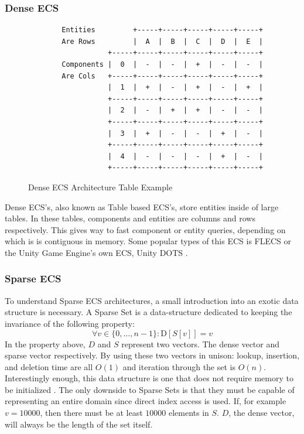 \subsubsection{Dense ECS}
\begin{figure}[htbp]
    \centering
    \begin{verbatim}
        Entities         +-----+-----+-----+-----+-----+  
        Are Rows         |  A  |  B  |  C  |  D  |  E  |  
                   +-----+-----+-----+-----+-----+-----+  
        Components |  0  |  -  |  -  |  +  |  -  |  -  |  
        Are Cols   +-----+-----+-----+-----+-----+-----+  
                   |  1  |  +  |  -  |  +  |  -  |  +  |  
                   +-----+-----+-----+-----+-----+-----+  
                   |  2  |  -  |  +  |  +  |  -  |  -  |  
                   +-----+-----+-----+-----+-----+-----+  
                   |  3  |  +  |  -  |  -  |  +  |  -  |  
                   +-----+-----+-----+-----+-----+-----+  
                   |  4  |  -  |  -  |  -  |  +  |  -  |  
                   +-----+-----+-----+-----+-----+-----+                                 
    \end{verbatim}
    \caption{Dense ECS Architecture Table Example}
\end{figure}

Dense ECS's, also known as Table based ECS's, store entities inside of large tables. In these tables, components and entities are columns and rows respectively. This gives way to fast component or entity queries, depending on which is is contiguous in memory. Some popular types of this ECS is FLECS or the Unity Game Engine's own ECS, Unity DOTS \cite{SanderMertensFAQ}.

\subsubsection{Sparse ECS}
To understand Sparse ECS architectures, a small introduction into an exotic data structure is necessary. A Sparse Set is a data-structure dedicated to keeping the invariance of the following property:
\begin{equation*}
    \forall v \in \{0,\ldots, n-1\} : \text{D}[S[v]] = v
\end{equation*}
In the property above, $D$ and $S$ represent two vectors. The dense vector and sparse vector respectively. By using these two vectors in unison: lookup, insertion, and deletion time are all $O(1)$ and iteration through the set is $O(n)$. Interestingly enough, this data structure is one that does not require memory to be initialized \cite{sparse_profit}. The only downside to Sparse Sets is that they must be capable of representing an entire domain since direct index access is used. If, for example $v = 10000$, then there must be at least $10000$ elements in $S$. $D$, the dense vector, will always be the length of the set itself.

